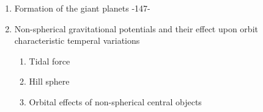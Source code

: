 \documentclass[12pt]{article}
\begin{document}
\begin{enumerate}[label=\Roman*.]
\begin{enumerate}[label=\arabic*.]
        \end{enumerate}
    \item Formation of the giant planets -147-
    \item Non-spherical gravitational potentials and their effect upon
        orbit characteristic temperal variations
        \begin{enumerate}[label=\arabic*.]
            \item Tidal force
            \item Hill sphere
            \item Orbital effects of non-spherical central objects
        \end{enumerate}
\end{enumerate}
\end{document}
